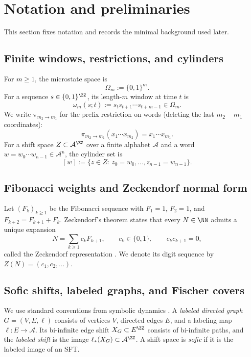 \section{Notation and preliminaries}\label{sec:preliminaries}

This section fixes notation and records the minimal background used later.

\subsection{Finite windows, restrictions, and cylinders}\label{subsec:notation-windows}
For $m\ge 1$, the microstate space is
\[
\Omega_m:=\{0,1\}^m.
\]
For a sequence $s\in\{0,1\}^{\ZZ}$, its length-$m$ window at time $t$ is
\[
\omega_m(s;t):=s_t s_{t+1}\cdots s_{t+m-1}\in\Omega_m.
\]
We write $\pi_{m_2\to m_1}$ for the prefix restriction on words (deleting the last $m_2-m_1$ coordinates):
\[
\pi_{m_2\to m_1}(x_1\cdots x_{m_2})=x_1\cdots x_{m_1}.
\]
For a shift space $Z\subset \mathcal{A}^{\ZZ}$ over a finite alphabet $\mathcal{A}$ and a word $w=w_0\cdots w_{n-1}\in\mathcal{A}^n$, the cylinder set is
\[
[w]:=\{z\in Z:\ z_0=w_0,\dots,z_{n-1}=w_{n-1}\}.
\]

\subsection{Fibonacci weights and Zeckendorf normal form}\label{subsec:prelim-zeckendorf}
Let $(F_k)_{k\ge 1}$ be the Fibonacci sequence with $F_1=1$, $F_2=1$, and $F_{k+2}=F_{k+1}+F_k$.
Zeckendorf's theorem states that every $N\in\NN$ admits a unique expansion
\[
N=\sum_{k\ge 1} c_k F_{k+1},\qquad c_k\in\{0,1\},\qquad c_k c_{k+1}=0,
\]
called the Zeckendorf representation \cite{Zeckendorf1972}.
We denote its digit sequence by $Z(N)=(c_1,c_2,\dots)$.

\subsection{Sofic shifts, labeled graphs, and Fischer covers}\label{subsec:prelim-sofic}
We use standard conventions from symbolic dynamics \cite{LindMarcus1995,Kitchens1998SymbolicDynamics}.
A \emph{labeled directed graph} $G=(V,E,\ell)$ consists of vertices $V$, directed edges $E$, and a labeling map $\ell:E\to\mathcal{A}$.
Its bi-infinite edge shift $X_G\subset E^{\ZZ}$ consists of bi-infinite paths, and the \emph{labeled shift} is the image $\ell_*(X_G)\subset\mathcal{A}^{\ZZ}$.
A shift space is \emph{sofic} if it is the labeled image of an SFT.

